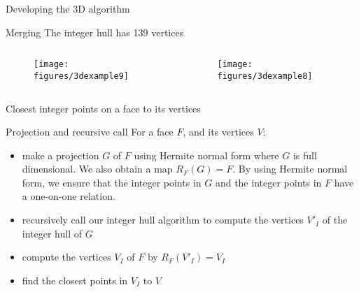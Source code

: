 \begin{frame}{Developing the 3D algorithm}
	\begin{block}{Merging}
		The integer hull has 139 vertices
		\begin{columns}
			\begin{column}{0.5\textwidth}
				\begin{center}
					
					\begin{figure}[H]
						\texttt{[image: figures/3dexample9]}
					\end{figure}
					
				\end{center}
				
			\end{column}
			\hfill
			\begin{column}{0.5\textwidth}
				\begin{center}
					\begin{figure}[H]
						\texttt{[image: figures/3dexample8]}
					\end{figure}
					
				\end{center}
				
			\end{column}
		\end{columns}
		
	\end{block}
\end{frame}

\begin{frame}{Closest integer points on a face to its vertices}
	\begin{block}{Projection and recursive call}
		For a face $F$, and its vertices $V$:
		\begin{itemize}
			\item make a projection
			$G$ of $F$ using Hermite normal form where $G$ is full dimensional. We also obtain a map $R_F(G) = F$. By using Hermite normal form, we ensure that the integer points in $G$ and the integer points in $F$ have a one-on-one relation.
			\item recursively call our integer hull algorithm to compute the vertices $V'_{I}$ of the integer hull of $G$
			\item compute the vertices $V_I$ of $F$ by $R_F(V'_I) = V_I$
			\item find the closest points in $V_I$ to $V$
		\end{itemize}
	\end{block}
\end{frame}

